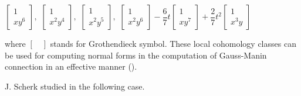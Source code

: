 \documentclass[pdftex]{arxsigma}
\begin{document}
\begin{remark*}
\vspace{1ex}
$\left[ \begin{array}{c} 1 \\ x  y^6 \end{array} \right] , $ $\left[ \begin{array}{c} 1 \\ x ^2 y^4 \end{array} \right] , $
$\left[ \begin{array}{c} 1 \\ x^2  y^5 \end{array} \right] , $ 
$\left[ \begin{array}{c} 1 \\ x^2  y^6 \end{array} \right] -\dfrac{6}{7}t\left[ \begin{array}{c} 1 \\ x  y^7 \end{array} \right] 
+\dfrac{2}{7}t^2\left[ \begin{array}{c} 1 \\ x^3  y \end{array} \right]  $

\vspace{1ex}
\noindent
where $ \left[ \quad \right] $ stands for Grothendieck symbol. 
These local cohomology classes can be used for computing normal forms in the computation of Gauss-Manin connection in an effective manner (\cite{TNN}).
\end{remark*}


J. Scherk studied in \cite{Sch} the following case.
\end{document}
